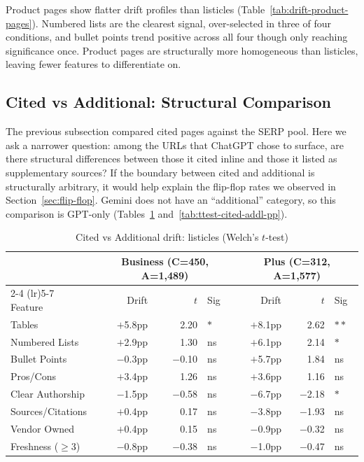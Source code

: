 Product pages show flatter drift profiles than listicles (Table~\ref{tab:drift-product-pages}). Numbered lists are the clearest signal, over-selected in three of four conditions, and bullet points trend positive across all four though only reaching significance once. Product pages are structurally more homogeneous than listicles, leaving fewer features to differentiate on.

\subsection{Cited vs Additional: Structural Comparison}
\label{sec:cited-vs-additional}

The previous subsection compared cited pages against the SERP pool. Here we ask a narrower question: among the URLs that ChatGPT chose to surface, are there structural differences between those it cited inline and those it listed as supplementary sources? If the boundary between cited and additional is structurally arbitrary, it would help explain the flip-flop rates we observed in Section~\ref{sec:flip-flop}. Gemini does not have an ``additional'' category, so this comparison is GPT-only (Tables~\ref{tab:ttest-cited-addl-listicle} and~\ref{tab:ttest-cited-addl-pp}).

\begin{table}[H]
\centering
\caption{Cited vs Additional drift: listicles (Welch's $t$-test)}
\label{tab:ttest-cited-addl-listicle}
\begin{tabular}{lrrlrrl}
\toprule
 & \multicolumn{3}{c}{Business (C=450, A=1{,}489)} & \multicolumn{3}{c}{Plus (C=312, A=1{,}577)} \\
\cmidrule(lr){2-4} \cmidrule(lr){5-7}
Feature & Drift & $t$ & Sig & Drift & $t$ & Sig \\
\midrule
Tables          & $+$5.8pp & 2.20 & $*$   & $+$8.1pp & 2.62 & $**$  \\
Numbered Lists  & $+$2.9pp & 1.30 & ns    & $+$6.1pp & 2.14 & $*$   \\
Bullet Points   & $-$0.3pp & $-$0.10 & ns & $+$5.7pp & 1.84 & ns    \\
Pros/Cons       & $+$3.4pp & 1.26 & ns    & $+$3.6pp & 1.16 & ns    \\
Clear Authorship& $-$1.5pp & $-$0.58 & ns & $-$6.7pp & $-$2.18 & $*$ \\
Sources/Citations& $+$0.4pp & 0.17 & ns   & $-$3.8pp & $-$1.93 & ns  \\
Vendor Owned    & $+$0.4pp & 0.15 & ns    & $-$0.9pp & $-$0.32 & ns  \\
Freshness ($\geq$3) & $-$0.8pp & $-$0.38 & ns & $-$1.0pp & $-$0.47 & ns \\
\bottomrule
\end{tabular}
\end{table}

